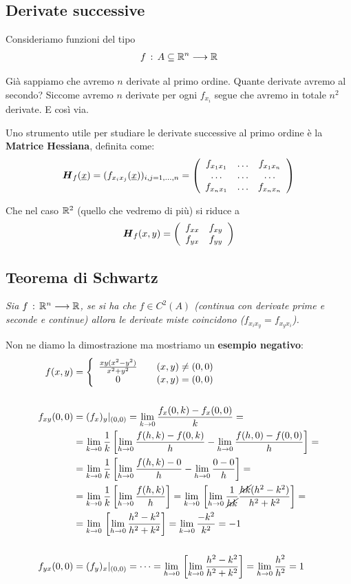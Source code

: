 \subsection{Derivate successive}

Consideriamo funzioni del tipo
\begin{align}
	f \, : \, A \subseteq \mathbb{R}^n \longrightarrow \mathbb{R}
\end{align}

Già sappiamo che avremo $n$ derivate al primo ordine. 
Quante derivate avremo al secondo? Siccome avremo $n$ derivate per ogni $f_{x_i}$ segue che avremo in totale $n^2$ derivate. E così via.

Uno strumento utile per studiare le derivate successive al primo ordine è la \textbf{Matrice Hessiana}, definita come:
\begin{align}
	\hessian{f}{\vecx} =(f_{x_i x_j} (\vecx))_{i,j=1,\dots,n}=\matrixThreeThree{f_{x_1 x_1}}{\dots}{f_{x_1 x_n}}{\dots}{\dots}{\dots}{f_{x_n x_1}}{\dots}{f_{x_n x_n}}
\end{align}

Che nel caso $\mathbb{R}^2$ (quello che vedremo di più) si riduce a 
\begin{align}
	\boldsymbol{H}_{f} (x,y)=\left( \begin{array}{ccc} f_{xx} & f_{xy} \\ f_{yx} & f_{yy} \end{array} \right)
\end{align}

\subsection{Teorema di Schwartz}

\textit{Sia $f \, : \, \mathbb{R}^n \longrightarrow \mathbb{R}$, se si ha che $f \in C^2(A)$ (continua con derivate prime e seconde e continue) allora le derivate miste coincidono ($f_{x_i x_y} = f_{x_y x_i}$).}
\bigskip

Non ne diamo la dimostrazione ma mostriamo un \textbf{esempio negativo}:
\begin{align}
	f(x,y)&=\left\{\begin{array}{cc} \frac{xy(x^2 - y^2)}{x^2 + y^2} \quad {}&(x,y)\neq (0,0) \\ 0 \quad &(x,y)=(0,0) \end{array}\right.\\
	\nonumber \\
	f_{xy}(0,0){}&=(f_x)_y|_{(0,0)}=\underset{k \rightarrow 0}{\lim} \,\frac{f_x(0,k) - f_x(0,0)}{k}= \nonumber \\
	&= \underset{k \rightarrow 0}{\lim} \, \frac{1}{k} \left[\underset{h \rightarrow 0}{\lim} \,\frac{f(h,k) - f(0,k)}{h} - \underset{h \rightarrow 0}{\lim} \,\frac{f(h,0) - f(0,0)}{h}
	\right]= \nonumber \\
	&= \underset{k \rightarrow 0}{\lim} \, \frac{1}{k} \left[\underset{h \rightarrow 0}{\lim} \,\frac{f(h,k) - 0}{h} - \underset{h \rightarrow 0}{\lim} \,\frac{0 - 0}{h}\right] = \nonumber \\
	&= \underset{k \rightarrow 0}{\lim} \, \frac{1}{k}\left[ \underset{h \rightarrow 0}{\lim} \, \frac{f(h,k)}{h}\right]= \underset{k \rightarrow 0}{\lim} \, \left[\underset{h \rightarrow 0}{\lim} \, \frac{1}{\cancel{hk}} \frac{\cancel{hk}(h^2 - k^2)}{h^2 + k^2}\right]=\nonumber \\
	&= \underset{k \rightarrow 0}{\lim} \, \left[\underset{h \rightarrow 0}{\lim} \,  \frac{h^2 - k^2}{h^2 + k^2}\right] = \underset{k \rightarrow 0}{\lim} \, \frac{-k^2}{k^2}=-1 \\
	\nonumber \\
	f_{yx}(0,0){}&=(f_y)_x|_{(0,0)}= \dots = \underset{h \rightarrow 0}{\lim} \, \left[\underset{k \rightarrow 0}{\lim} \,  \frac{h^2 - k^2}{h^2 + k^2}\right] = \underset{h \rightarrow 0}{\lim} \, \frac{h^2}{h^2}= 1
\end{align}

